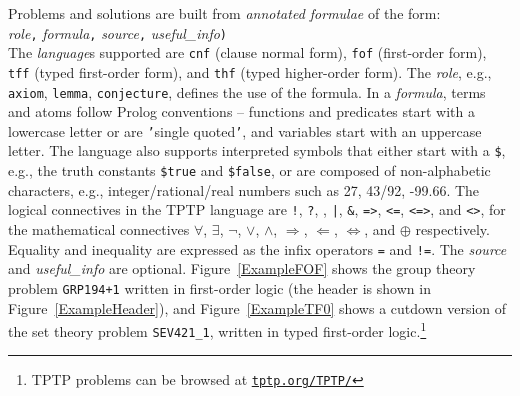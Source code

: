 \documentclass[runningheads]{llncs}
\newcommand{\smalltt}[1]{\small \texttt{#1}}
\begin{document}
Problems and solutions are built from {\em annotated formulae} of the form: \\
{\em role}{\tt ,}
{\em formula}{\tt ,}
{\em source}{\tt ,}
{\em useful\_info}{\tt )}\\
The {\em language}s supported are {\smalltt{cnf}} (clause normal form), {\smalltt{fof}}
(first-order form), {\smalltt{tff}} (typed first-order form), and {\smalltt{thf}}
(typed higher-order form).
The {\em role}, e.g., {\smalltt{axiom}}, {\smalltt{lemma}}, {\smalltt{conjecture}}, defines the 
use of the formula.
In a {\em formula}, terms and atoms follow Prolog conventions -- functions and predicates start 
with a lowercase letter or are {\tt '}single quoted{\tt '}, and variables start with an uppercase 
letter.
The language also supports interpreted symbols that either start with a {\tt \$}, e.g., the 
truth constants {\smalltt{\$true}} and {\smalltt{\$false}}, or are composed of 
non-alphabetic characters, e.g., integer/rational/real numbers such as 27, 43/92, -99.66.
The logical connectives in the TPTP language are
{\tt !}, {\tt ?}, {\tt {\raisebox{0.4ex}{\texttildelow}}}, {\tt |}, {\tt \&}, {\tt =>}, {\tt <=},
{\tt <=>}, and {\tt <{\raisebox{0.4ex}{\texttildelow}}>},
for the mathematical connectives
$\forall$, $\exists$, $\neg$, $\vee$, $\wedge$, $\Rightarrow$, $\Leftarrow$, $\Leftrightarrow$, 
and $\oplus$ respectively.
Equality and inequality are expressed as the infix operators {\tt =} and {\tt !=}.
The {\em source} and {\em useful\_info} are optional.
Figure~\ref{ExampleFOF} shows the group theory problem {\tt GRP194+1} written in first-order logic
(the header is shown in Figure~\ref{ExampleHeader}), and Figure~\ref{ExampleTF0} shows a cutdown 
version of the set theory problem {\tt SEV421\_1}, written in typed first-order logic.\footnote{%
TPTP problems can be browsed at \href{https://tptp.org/TPTP/}{{\tt tptp.org/TPTP/}}}
\end{document}
